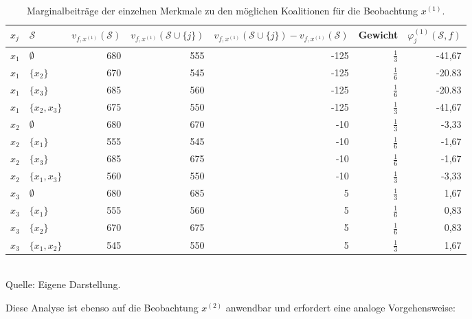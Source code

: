 \begin{table}[h]
    \caption{Marginalbeiträge der einzelnen Merkmale zu den möglichen Koalitionen für die Beobachtung $x^{(1)}$.}
    \footnotesize
    \begin{tabularx}{\textwidth}{XXrrrrr}
    \toprule
    $x_{j}$ & $\mathcal{S}$ & $v_{f, x^{(1)}}(\mathcal{S})$ & $v_{f, x^{(1)}}(\mathcal{S} \cup \{j\})$ & $v_{f, x^{(1)}}(\mathcal{S} \cup \{j\}) - v_{f, x^{(1)}}(\mathcal{S})$ & Gewicht & $\varphi_{j}^{(1)}(\mathcal{S}, f)$\\
    \midrule
    $x_1$ & $\emptyset$ & 680 & 555 & -125 & $\frac{1}{3}$ & -41,67 \\
    $x_1$ & $\{x_2\}$ & 670 & 545 & -125 & $\frac{1}{6}$ & -20.83 \\
    $x_1$ & $\{x_3\}$ & 685 & 560 & -125 & $\frac{1}{6}$ & -20.83 \\
    $x_1$ & $\{x_2, x_3\}$ & 675 & 550 & -125 & $\frac{1}{3}$ & -41,67 \\
    $x_2$ & $\emptyset$ & 680 & 670 & -10 & $\frac{1}{3}$ & -3,33 \\
    $x_2$ & $\{x_1\}$ & 555 & 545 & -10 & $\frac{1}{6}$ & -1,67 \\
    $x_2$ & $\{x_3\}$ & 685 & 675 & -10 & $\frac{1}{6}$ & -1,67 \\
    $x_2$ & $\{x_1, x_3\}$ & 560 & 550 & -10 & $\frac{1}{3}$ & -3,33 \\
    $x_3$ & $\emptyset$ & 680 & 685 & 5 & $\frac{1}{3}$ & 1,67 \\
    $x_3$ & $\{x_1\}$ & 555 & 560 & 5 & $\frac{1}{6}$ & 0,83 \\
    $x_3$ & $\{x_2\}$ & 670 & 675 & 5 & $\frac{1}{6}$ & 0,83 \\
    $x_3$ & $\{x_1, x_2\}$ & 545 & 550 & 5 & $\frac{1}{3}$ & 1,67 \\
    \bottomrule
    \end{tabularx}
    \label{tab:shapley_marginal_features_x1}
    \normalsize\\
    Quelle: Eigene Darstellung.
\end{table}

Diese Analyse ist ebenso auf die Beobachtung $x^{(2)}$ anwendbar und erfordert eine analoge Vorgehensweise:

